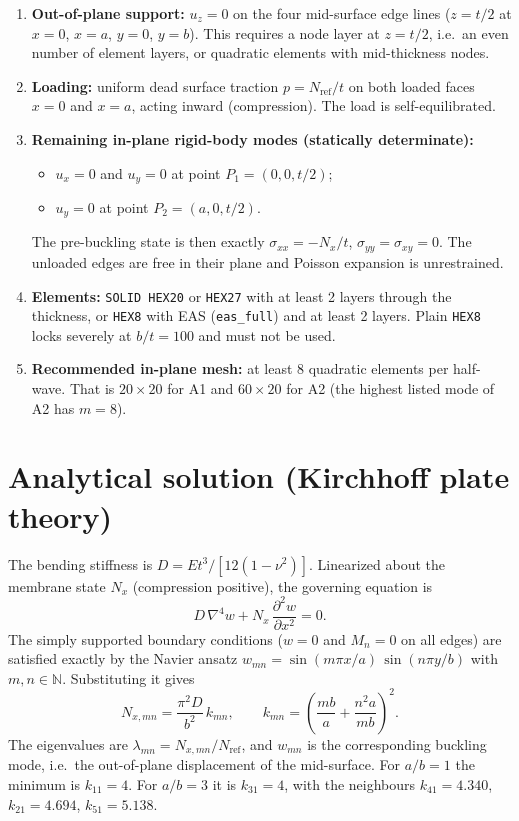 \documentclass[11pt,a4paper]{report}
\begin{document}
\begin{enumerate}
\item \textbf{Out-of-plane support:} $u_z = 0$ on the four mid-surface edge
  lines ($z=t/2$ at $x=0$, $x=a$, $y=0$, $y=b$). This requires a node layer at
  $z=t/2$, i.e.\ an even number of element layers, or quadratic elements with
  mid-thickness nodes.
\item \textbf{Loading:} uniform dead surface traction $p = N_\text{ref}/t$ on
  both loaded faces $x=0$ and $x=a$, acting inward (compression). The load is
  self-equilibrated.
\item \textbf{Remaining in-plane rigid-body modes (statically determinate):}
  \begin{itemize}
  \item $u_x = 0$ and $u_y=0$ at point $P_1=(0,0,t/2)$;
  \item $u_y = 0$ at point $P_2=(a,0,t/2)$.
  \end{itemize}
  The pre-buckling state is then exactly
  $\sigma_{xx} = -N_x/t$, $\sigma_{yy}=\sigma_{xy}=0$. The unloaded edges are
  free in their plane and Poisson expansion is unrestrained.
\item \textbf{Elements:} \texttt{SOLID HEX20} or \texttt{HEX27} with at least
  2 layers through the thickness, or \texttt{HEX8} with EAS
  (\texttt{eas\_full}) and at least 2 layers. Plain \texttt{HEX8} locks
  severely at $b/t=100$ and must not be used.
\item \textbf{Recommended in-plane mesh:} at least 8 quadratic elements per
  half-wave. That is $20\times20$ for A1 and $60\times20$ for A2 (the
  highest listed mode of A2 has $m=8$).
\end{enumerate}

\section{Analytical solution (Kirchhoff plate theory)}

The bending stiffness is $D = E t^3/[12(1-\nu^2)]$. Linearized about the
membrane state $N_x$ (compression positive), the governing equation is
\begin{equation}
  D\,\nabla^4 w + N_x\,\frac{\partial^2 w}{\partial x^2} = 0 .
\end{equation}
The simply supported boundary conditions ($w=0$ and $M_n=0$ on all edges) are
satisfied exactly by the Navier ansatz
$w_{mn} = \sin(m\pi x/a)\,\sin(n\pi y/b)$ with $m,n\in\mathbb{N}$.
Substituting it gives
\begin{equation}
  N_{x,mn} = \frac{\pi^2 D}{b^2}\,k_{mn},
  \qquad
  k_{mn} = \left(\frac{m b}{a} + \frac{n^2 a}{m b}\right)^2 .
  \label{eq:plate}
\end{equation}
The eigenvalues are $\lambda_{mn}=N_{x,mn}/N_\text{ref}$, and $w_{mn}$ is the
corresponding buckling mode, i.e.\ the out-of-plane displacement of the
mid-surface. For $a/b=1$ the minimum is $k_{11}=4$. For $a/b=3$ it is
$k_{31}=4$, with the neighbours $k_{41}=4.340$, $k_{21}=4.694$, $k_{51}=5.138$.
\end{document}
